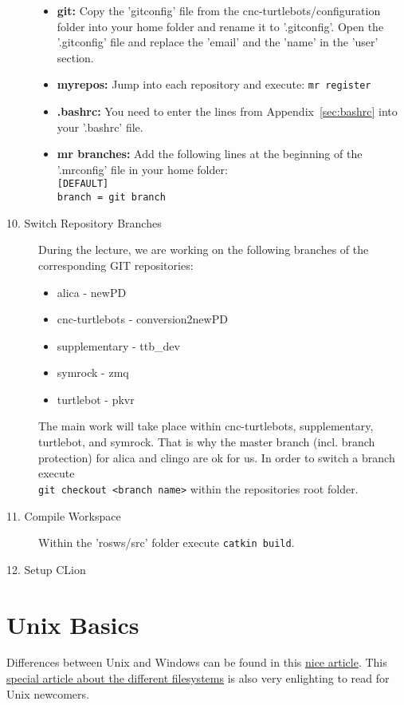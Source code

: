 \begin{description}
		\begin{itemize}
			\item \textbf{git:} Copy the 'gitconfig' file from the cnc-turtlebots/configuration folder into your home folder and rename it to '.gitconfig'. Open the '.gitconfig' file and replace the 'email' and the 'name' in the 'user' section.
			\item \textbf{myrepos:} Jump into each repository and execute: \verb#mr register#
			\item \textbf{.bashrc:} You need to enter the lines from Appendix~\ref{sec:bashrc} into your '.bashrc' file.
			\item \textbf{mr branches:} Add the following lines at the beginning of the '.mrconfig' file in your home folder:\\
			\verb#[DEFAULT]#\\
			\verb#branch = git branch#
		\end{itemize}
	\item[10. Switch Repository Branches] During the lecture, we are working on the following branches of the corresponding GIT repositories:
	\begin{itemize}
		\item alica - newPD
		\item cnc-turtlebots - conversion2newPD
		\item supplementary - ttb\_dev
		\item symrock - zmq
		\item turtlebot - pkvr
	\end{itemize}
	The main work will take place within cnc-turtlebots, supplementary, turtlebot, and symrock. That is why the master branch (incl. branch protection) for alica and clingo are ok for us. In order to switch a branch execute\\\verb#git checkout <branch name># within the repositories root folder.
	\item[11. Compile Workspace] Within the 'rosws/src' folder execute \verb#catkin build#.
	\item[12. Setup CLion]
\end{description}

\section{Unix Basics}
\label{sec:LinuxBasics}

Differences between Unix and Windows can be found in this \href{https://www.techrepublic.com/blog/10-things/10-fundamental-differences-between-linux-and-windows/}{nice article}. This \href{https://www.howtogeek.com/137096/6-ways-the-linux-file-system-is-different-from-the-windows-file-system/}{special article about the different filesystems} is also very enlighting to read for Unix newcomers.

